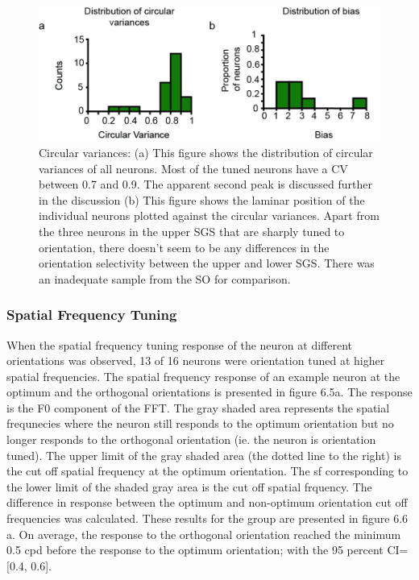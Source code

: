 	\begin{figure}
		\includegraphics[width=\linewidth]{superiorcolliculus/cvlampos.jpg}
		\caption{Circular variances: (a) This figure shows the distribution of circular
			variances of all neurons. Most of the tuned neurons have a CV between 0.7 and 0.9. The apparent second peak is discussed further in the discussion (b) This figure shows the laminar position of the individual neurons plotted against the circular variances. Apart from the three neurons in the upper SGS that are sharply tuned to orientation, there doesn't seem to be any differences in the orientation selectivity between the upper and lower SGS. There was an inadequate sample from the SO for comparison.}
		\label{fig:fig4}			
	\end{figure}
	

	
	
	\subsubsection{Spatial Frequency Tuning}
	When the spatial frequency tuning response of the neuron at different orientations was observed, 13 of 16 neurons were orientation tuned at higher spatial frequencies. The spatial frequency response of an example neuron at the optimum and the orthogonal orientations is presented in figure 6.5a. The response is the F0 component of the FFT. The gray shaded area represents the spatial frequnecies where the neuron still responds to the optimum orientation but no longer responds to the orthogonal orientation (ie. the neuron is orientation tuned).  The upper limit of the gray shaded area (the dotted line to the right) is the cut off spatial frequency at the optimum orientation. The sf corresponding to the lower limit of the shaded gray area is the cut off spatial frquency. The difference in response between the optimum and non-optimum orientation cut off frequencies was calculated. These results for the group are presented in figure 6.6 a. On average, the response to the orthogonal orientation reached the minimum 0.5 cpd before the response to the optimum orientation; with the 95 percent CI= [0.4, 0.6].
	
